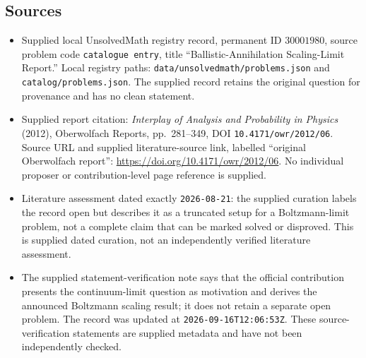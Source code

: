 \documentclass[11pt]{article}
\begin{document}
\subsection{Sources}
\begin{itemize}
\item Supplied local UnsolvedMath registry record, permanent ID \(30001980\), source problem code \texttt{catalogue entry}, title ``Ballistic-Annihilation Scaling-Limit Report.'' Local registry paths: \texttt{data/unsolvedmath/problems.json} and \texttt{catalog/problems.json}. The supplied record retains the original question for provenance and has no clean statement.
\item Supplied report citation: \emph{Interplay of Analysis and Probability in Physics} (2012), Oberwolfach Reports, pp.~281--349, DOI \texttt{10.4171/owr/2012/06}. Source URL and supplied literature-source link, labelled ``original Oberwolfach report'': \url{https://doi.org/10.4171/owr/2012/06}. No individual proposer or contribution-level page reference is supplied.
\item Literature assessment dated exactly \texttt{2026-08-21}: the supplied curation labels the record open but describes it as a truncated setup for a Boltzmann-limit problem, not a complete claim that can be marked solved or disproved. This is supplied dated curation, not an independently verified literature assessment.
\item The supplied statement-verification note says that the official contribution presents the continuum-limit question as motivation and derives the announced Boltzmann scaling result; it does not retain a separate open problem. The record was updated at \texttt{2026-09-16T12:06:53Z}. These source-verification statements are supplied metadata and have not been independently checked.
\end{itemize}
\end{document}
